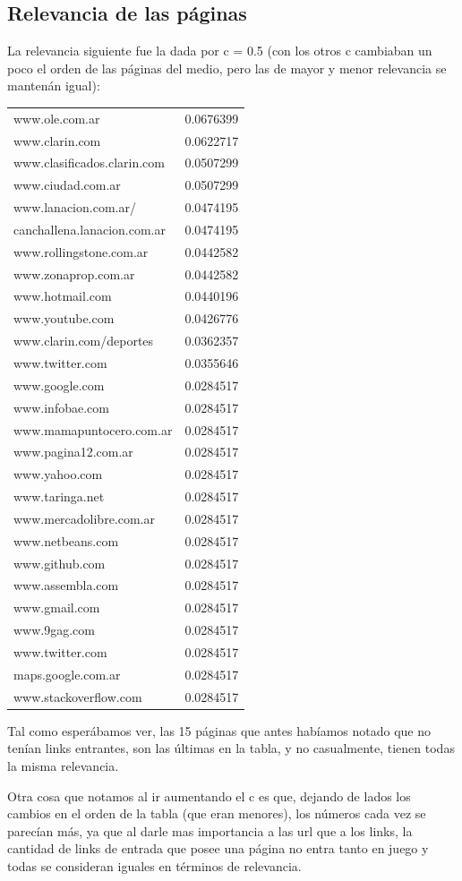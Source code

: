 \subsection{Relevancia de las p\'aginas}

La relevancia siguiente fue la dada por c = 0.5 (con los otros c cambiaban un poco el orden de las p\'aginas del medio, pero 
las de mayor y menor relevancia se manten\'an igual):

\begin{tabular}{ l | c }
  \hline
  www.ole.com.ar & 0.0676399\\	
  www.clarin.com & 0.0622717\\
  www.clasificados.clarin.com & 0.0507299\\
  www.ciudad.com.ar & 0.0507299\\
  www.lanacion.com.ar/ & 0.0474195\\
  canchallena.lanacion.com.ar & 0.0474195\\
  www.rollingstone.com.ar & 0.0442582\\
  www.zonaprop.com.ar & 0.0442582\\
  www.hotmail.com & 0.0440196\\
  www.youtube.com & 0.0426776\\
  www.clarin.com/deportes & 0.0362357\\
  www.twitter.com & 0.0355646\\
  www.google.com & 0.0284517\\
  www.infobae.com & 0.0284517\\
  www.mamapuntocero.com.ar & 0.0284517\\
  www.pagina12.com.ar & 0.0284517\\
  www.yahoo.com & 0.0284517\\
  www.taringa.net & 0.0284517\\
  www.mercadolibre.com.ar & 0.0284517\\
  www.netbeans.com & 0.0284517\\
  www.github.com & 0.0284517\\
  www.assembla.com & 0.0284517\\
  www.gmail.com & 0.0284517\\
  www.9gag.com & 0.0284517\\
  www.twitter.com & 0.0284517\\
  maps.google.com.ar & 0.0284517\\
  www.stackoverflow.com & 0.0284517\\
  \hline
\end{tabular}\newline


Tal como esper\'abamos ver, las 15 p\'aginas que antes hab\'iamos notado que no ten\'ian links entrantes, son las \'ultimas
en la tabla, y no casualmente, tienen todas la misma relevancia.

Otra cosa que notamos al ir aumentando el c es que, dejando de lados los cambios en el orden de la tabla (que eran menores),
los n\'umeros cada vez se parec\'ian m\'as, ya que al darle mas importancia a las url que a los links, la cantidad
de links de entrada que posee una p\'agina no entra tanto en juego y todas se consideran iguales en t\'erminos de relevancia.

